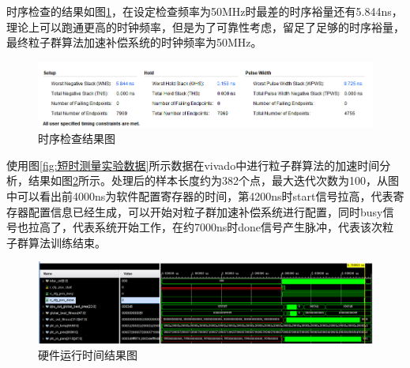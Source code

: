 时序检查的结果如图\ref{fig:时序检查结果图}，在设定检查频率为50MHz时最差的时序裕量还有5.844ns，理论上可以跑通更高的时钟频率，但是为了可靠性考虑，留足了足够的时序裕量，最终粒子群算法加速补偿系统的时钟频率为50MHz。
\begin{figure}[htb]
  \centering
  \includegraphics[width=14cm]{fig/6-fig/时序检查结果.png}
  \caption{时序检查结果图}
  \label{fig:时序检查结果图}
\end{figure}

使用图\ref{fig:短时测量实验数据}所示数据在vivado中进行粒子群算法的加速时间分析，结果如图\ref{fig:硬件运行时间结果图}所示。处理后的样本长度约为382个点，最大迭代次数为100，从图中可以看出前4000ns为软件配置寄存器的时间，第4200ns时start信号拉高，代表寄存器配置信息已经生成，可以开始对粒子群加速补偿系统进行配置，同时busy信号也拉高了，代表系统开始工作，在约7000ns时done信号产生脉冲，代表该次粒子群算法训练结束。
\begin{figure}[htb]
  \centering
  \includegraphics[width=14cm]{fig/6-fig/硬件运行时间.png}
  \caption{硬件运行时间结果图}
  \label{fig:硬件运行时间结果图}
\end{figure}


